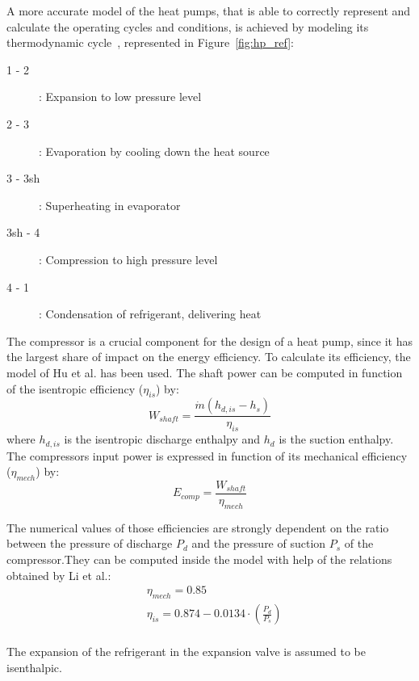 \documentclass{article}
\begin{document}
A more accurate model of the heat pumps, that is able to correctly represent and calculate the operating cycles and conditions, is achieved by modeling its thermodynamic cycle~\cite{demierreModelingExperimentalInvestigation2014}, represented in Figure~\ref{fig:hp_ref}:

\begin{description}
	\item [1 - 2]: Expansion to low pressure level
	\item [2 - 3]: Evaporation by cooling down the heat source
	\item [3 - 3sh]: Superheating in evaporator
	\item [3sh - 4]: Compression to high pressure level
	\item [4 - 1]: Condensation of refrigerant, delivering heat
\end{description}

The compressor is a crucial component for the design of a heat pump, since it has the largest share of impact on the energy efficiency. To calculate its efficiency, the model of Hu et al.\cite{huExtremumSeekingControl2015} has been used. The shaft power can be computed in function of the isentropic efficiency ($\eta_{is}$) by:
\begin{equation}
W_{shaft} = \frac{\dot{m}(h_{d,is}-h_{s})}{\eta_{is}} 
\end{equation}
where $h_{d,is}$ is the isentropic discharge enthalpy and $h_{d}$ is the suction enthalpy. The compressors input power is expressed in function of its mechanical efficiency ($\eta_{mech}$) by:
\begin{equation}
E_{comp} = \frac{W_{shaft}}{\eta_{mech}}  
\end{equation}

The numerical values of those efficiencies are strongly dependent on the ratio between the pressure of discharge $P_{d}$ and the pressure of suction $P_{s}$ of the compressor.They can be computed inside the model with help of the relations obtained by Li et al.\cite{liPerformanceCharacteristicsR1234yf2014}:
\begin{align}
& \eta_{mech} = 0.85\\
& \eta_{is} = 0.874-0.0134\cdot(\frac{P_{d}}{P_{s}})\\
\end{align}
		
The expansion of the refrigerant in the expansion valve is assumed to be isenthalpic.\\ 
\end{document}
